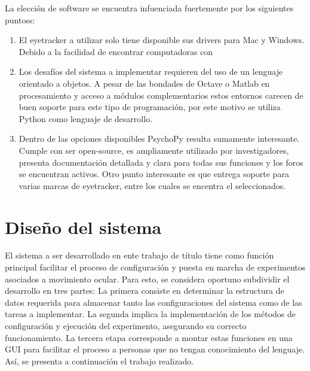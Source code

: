 \documentclass[\main/main.tex]{subfiles}
\begin{document}
	\newpage
	La elección de software se encuentra infuenciada fuertemente por los siguientes puntoss:
	\begin{enumerate}
		\item El eyetracker a utilizar solo tiene disponible sus drivers para Mac y Windows. Debido a la facilidad de encontrar computadoras con %

		\item Los desafíos del sistema a implementar requieren del uso de un lenguaje orientado a objetos. A pesar de las bondades de Octave o Matlab en procesamiento y acceso a módulos complementarios estos entornos carecen de buen soporte para este tipo de programación, por este motivo se utiliza Python como lenguaje de desarrollo. 

		\item Dentro de las opciones disponibles PsychoPy resulta sumamente interesante. Cumple con ser open-source, es ampliamente utilizado por investigadores, presenta documentación detallada y clara para todas sus funciones y los foros se encuentran activos. Otro punto interesante es que entrega soporte para varias marcas de eyetracker, entre los cuales se encentra el seleccionados.

	\end{enumerate}

\newpage
\section{Diseño del sistema}
\label{sec:03_diseño_sistema}
	El sistema a ser desarrollado en ente trabajo de título tiene como función principal facilitar el proceso de configuración y puesta en marcha de experimentos asociados a movimiento ocular. Para esto, se considera oportuno subdividir el desarrollo en tres partes: La primera consiste en determinar la estructura de datos requerida para almacenar tanto las configuraciones del sistema como de las tareas a implementar. La segunda implica la implementación de los métodos de configuración y ejecución del experimento, asegurando su correcto funcionamiento. La tercera etapa corresponde a montar estas funciones en una GUI para facilitar el proceso a personas que no tengan conocimiento del lenguaje. Así, se presenta a continuación el trabajo realizado.
\end{document}
